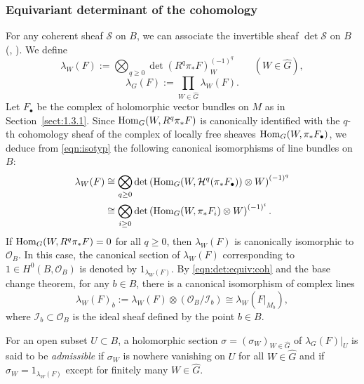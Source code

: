 \documentclass[amscd, leqno]{amsart}
\theoremstyle{plain}
\theoremstyle{definition}
\theoremstyle{remark}
\begin{document}
\subsubsection
{Equivariant determinant of the cohomology}
\label{sect:1.3.2}
\par
For any coherent sheaf ${\mathscr S}$ on $B$, we can associate the invertible sheaf $\det{\mathscr S}$ on $B$ 
(\cite{KnudsenMumford76}, \cite[III, Sect.\,3]{BGS88}). We define
$$
\lambda_{W}(F) := \bigotimes_{q\geq0} \det (R^{q}\pi_{*}F)_{W}^{(-1)^{q}}
\qquad
(W \in \widehat{G}),
$$
$$
\lambda_{G}(F) := \prod_{W\in\widehat{G}}\lambda_{W}(F).
$$
Let $F_{\bullet}$ be the complex of holomorphic vector bundles on $M$ as in Section~\ref{sect:1.3.1}.
Since ${\rm Hom}_{G}(W, R^{q}\pi_{*}F)$ is canonically identified with the $q$-th cohomology sheaf of the complex of locally free sheaves
${\rm Hom}_{G}(W, \pi_{*}F_{\bullet})$, we deduce from \eqref{eqn:isotyp} the following canonical isomorphisms of line bundles on $B$:
\begin{equation}
\label{eqn:det:equiv:coh}
\begin{aligned}
\lambda_{W}(F) 
&\cong 
\bigotimes_{q\geq0} \det\left({\rm Hom}_{G}(W, {\mathcal H}^{q}(\pi_{*}F_{\bullet}))\otimes W\right)^{(-1)^{q}}
\\
&\cong
\bigotimes_{i\geq0} \det\left({\rm Hom}_{G}(W, \pi_{*}F_{i})\otimes W\right)^{(-1)^{i}}.
\end{aligned}
\end{equation}
If ${\rm Hom}_{G}(W,R^{q}\pi_{*}F)=0$ for all $q\geq0$, then $\lambda_{W}(F)$ is canonically isomorphic to ${\mathcal O}_{B}$.
In this case, the canonical section of $\lambda_{W}(F)$ corresponding to $1\in H^{0}(B,{\mathcal O}_{B})$ is denoted by $1_{\lambda_{W}(F)}$. 
By \eqref{eqn:det:equiv:coh} and the base change theorem, for any $b\in B$, there is a canonical isomorphism of complex lines
\begin{equation}
\label{eqn:fiber}
\lambda_{W}(F)_{b} := \lambda_{W}(F) \otimes ({\mathcal O}_{B}/{\mathcal I}_{b}) \cong \lambda_{W}(F|_{M_{b}}),
\end{equation}
where ${\mathcal I}_{b} \subset {\mathcal O}_{B}$ is the ideal sheaf defined by the point $b \in B$.
\par
For an open subset $U\subset B$, a holomorphic section $\sigma=(\sigma_{W})_{W\in\widehat{G}}$ of $\lambda_{G}(F)|_{U}$ is said to be {\em admissible}
if $\sigma_{W}$ is nowhere vanishing on $U$ for all $W\in\widehat{G}$ and if $\sigma_{W}=1_{\lambda_{W}(F)}$ except for finitely many $W\in\widehat{G}$. 
\end{document}
